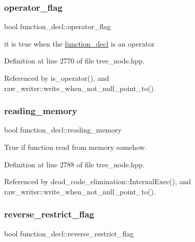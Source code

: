 \subsubsection{\texorpdfstring{operator\+\_\+flag}{operator\_flag}}
{\footnotesize\ttfamily bool function\+\_\+decl\+::operator\+\_\+flag}



it is true when the \hyperlink{structfunction__decl}{function\+\_\+decl} is an operator 



Definition at line 2770 of file tree\+\_\+node.\+hpp.



Referenced by is\+\_\+operator(), and raw\+\_\+writer\+::write\+\_\+when\+\_\+not\+\_\+null\+\_\+point\+\_\+to().

\mbox{\label{structfunction__decl_a5d305fdaae62e89a09ae7b605132f976}} 
\subsubsection{\texorpdfstring{reading\+\_\+memory}{reading\_memory}}
{\footnotesize\ttfamily bool function\+\_\+decl\+::reading\+\_\+memory}



True if function read from memory somehow. 



Definition at line 2788 of file tree\+\_\+node.\+hpp.



Referenced by dead\+\_\+code\+\_\+elimination\+::\+Internal\+Exec(), and raw\+\_\+writer\+::write\+\_\+when\+\_\+not\+\_\+null\+\_\+point\+\_\+to().

\mbox{\label{structfunction__decl_a27032f0497756b6df0d2c1a7f5632051}} 
\subsubsection{\texorpdfstring{reverse\+\_\+restrict\+\_\+flag}{reverse\_restrict\_flag}}
{\footnotesize\ttfamily bool function\+\_\+decl\+::reverse\+\_\+restrict\+\_\+flag}



